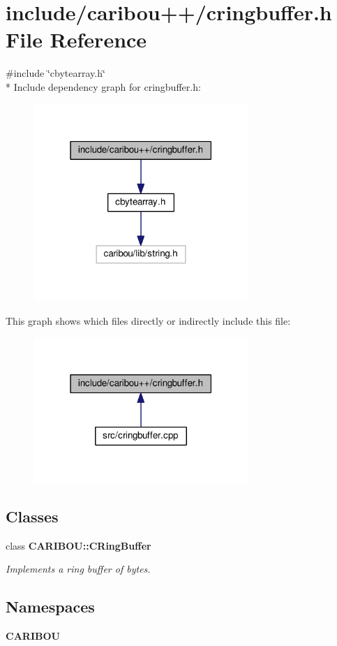 \section{include/caribou++/cringbuffer.h File Reference}
\label{cringbuffer_8h}
{\ttfamily \#include \char`\"{}cbytearray.\+h\char`\"{}}\\*
Include dependency graph for cringbuffer.\+h\+:
\nopagebreak
\begin{figure}[H]
\begin{center}
\leavevmode
\includegraphics[width=231pt]{cringbuffer_8h__incl}
\end{center}
\end{figure}
This graph shows which files directly or indirectly include this file\+:
\nopagebreak
\begin{figure}[H]
\begin{center}
\leavevmode
\includegraphics[width=231pt]{cringbuffer_8h__dep__incl}
\end{center}
\end{figure}
\subsection*{Classes}
\begin{DoxyCompactItemize}
\item 
class {\bf C\+A\+R\+I\+B\+O\+U\+::\+C\+Ring\+Buffer}
\begin{DoxyCompactList}\small\item\em Implements a ring buffer of bytes. \end{DoxyCompactList}\end{DoxyCompactItemize}
\subsection*{Namespaces}
\begin{DoxyCompactItemize}
\item 
 {\bf C\+A\+R\+I\+B\+OU}
\end{DoxyCompactItemize}
